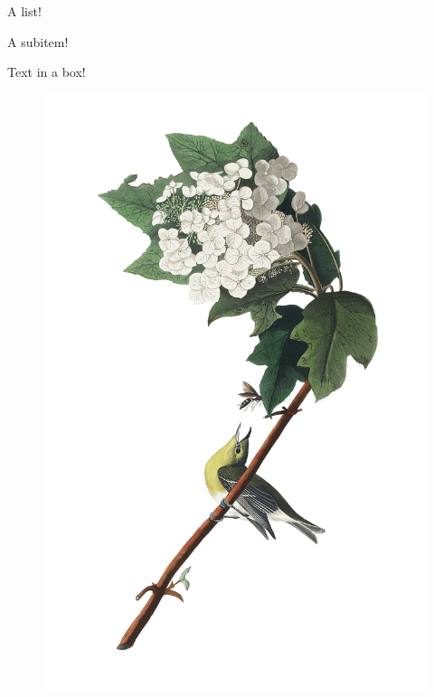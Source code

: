\Huge %
\begin{center}
    {\myfont  {}}
\end{center}
  
\Large


\begin{myitems}
A list!
    \begin{myitems}
        A subitem!
    \end{myitems}
\end{myitems}

\begin{mybox}
    \begin{center}
        Text in a box!
    \end{center}
\end{mybox}

\begin{figure}
    \centering
    \includegraphics[width = 4 cm]{img/HTC_Heritage Library_Nature Symphony 15Element 3.png}
\end{figure}